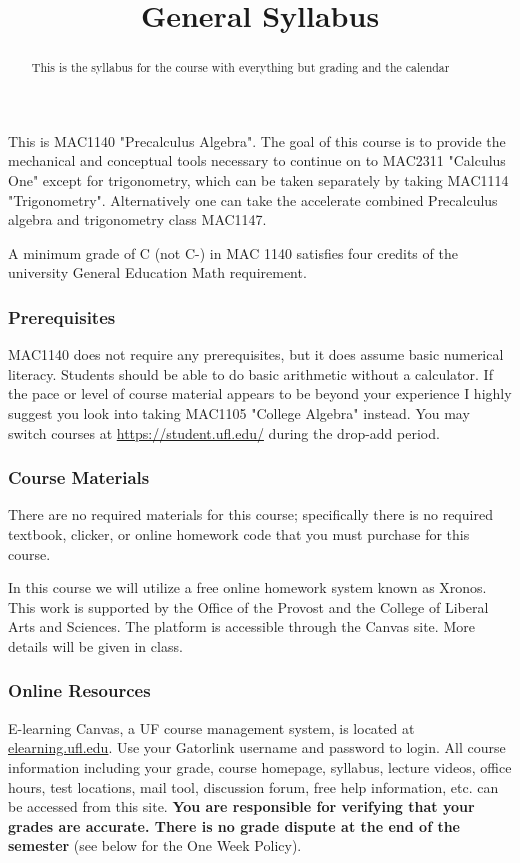 \documentclass{ximeraXloud}
\title{General Syllabus}
\begin{document}
\begin{abstract}
This is the syllabus for the course with everything but grading and the calendar
\end{abstract}
\maketitle

This is MAC1140 "Precalculus Algebra". The goal of this course is to provide the mechanical and conceptual tools necessary to continue on to MAC2311 "Calculus One" except for trigonometry, which can be taken separately by taking MAC1114 "Trigonometry". Alternatively one can take the accelerate combined Precalculus algebra and trigonometry class MAC1147.

A minimum grade of C (not C-) in MAC 1140 satisfies four credits of the university General Education Math requirement.%

\subsubsection*{Prerequisites}
MAC1140 does not require any prerequisites, but it does assume basic numerical literacy. Students should be able to do basic arithmetic without a calculator. If the pace or level of course material appears to be beyond your experience I highly suggest you look into taking MAC1105 "College Algebra" instead. You may switch courses at \url{https://student.ufl.edu/} during the drop-add period.


\subsubsection*{Course Materials}
    There  are  no  required  materials for this course; specifically there is no required textbook, clicker, or online homework code that you must purchase for  this  course. %
    
    In this course we will utilize a free online homework system known as Xronos. This work is supported by the Office of the Provost and the College of Liberal Arts and Sciences.  The platform is accessible through the Canvas site.  More details will be given in class.


\subsubsection*{Online Resources}
    E-learning Canvas, a UF course management system, is located at \url{elearning.ufl.edu}.  Use your Gatorlink username and password to login.  All course information including your grade, course homepage, syllabus, lecture videos,  office  hours,  test locations,  mail tool,  discussion forum,  free help information,  etc. can be accessed from this site.  \textbf{You are responsible for verifying that your grades are accurate.  There is no grade dispute at the end of the semester} (see below for the One Week Policy).
\end{document}
